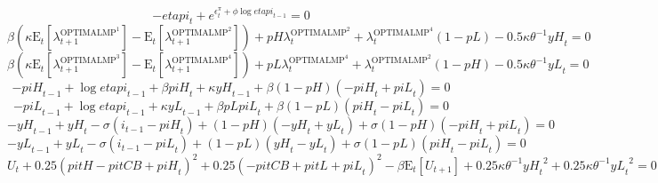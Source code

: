 \begin{equation}
-{e\!t\!a\!p\!i}_{t} + e^{\epsilon^{\pi}_{t} + {\phi} {\log{{e\!t\!a\!p\!i}_{t-1}}}} = 0
\end{equation}
\begin{equation}
{\beta} \left({\kappa} {\mathrm{E}_{t}\left[\lambda^{\mathrm{OPTIMALMP}^{\mathrm{1}}}_{t+1}\right]} - \mathrm{E}_{t}\left[\lambda^{\mathrm{OPTIMALMP}^{\mathrm{2}}}_{t+1}\right]\right) + {{p\!H}} {\lambda^{\mathrm{OPTIMALMP}^{\mathrm{2}}}_{t}} + {\lambda^{\mathrm{OPTIMALMP}^{\mathrm{4}}}_{t}} \left(1 - {p\!L}\right) - 0.5{\kappa} {\theta}^{-1} {{y\!H}_{t}} = 0
\end{equation}
\begin{equation}
{\beta} \left({\kappa} {\mathrm{E}_{t}\left[\lambda^{\mathrm{OPTIMALMP}^{\mathrm{3}}}_{t+1}\right]} - \mathrm{E}_{t}\left[\lambda^{\mathrm{OPTIMALMP}^{\mathrm{4}}}_{t+1}\right]\right) + {{p\!L}} {\lambda^{\mathrm{OPTIMALMP}^{\mathrm{4}}}_{t}} + {\lambda^{\mathrm{OPTIMALMP}^{\mathrm{2}}}_{t}} \left(1 - {p\!H}\right) - 0.5{\kappa} {\theta}^{-1} {{y\!L}_{t}} = 0
\end{equation}
\begin{equation}
-{p\!i\!H}_{t-1} + \log{{e\!t\!a\!p\!i}_{t-1}} + {\beta} {{p\!i\!H}_{t}} + {\kappa} {{y\!H}_{t-1}} + {\beta} \left(1 - {p\!H}\right) \left(-{p\!i\!H}_{t} + {p\!i\!L}_{t}\right) = 0
\end{equation}
\begin{equation}
-{p\!i\!L}_{t-1} + \log{{e\!t\!a\!p\!i}_{t-1}} + {\kappa} {{y\!L}_{t-1}} + {\beta} {{p\!L}} {{p\!i\!L}_{t}} + {\beta} \left(1 - {p\!L}\right) \left({p\!i\!H}_{t} - {p\!i\!L}_{t}\right) = 0
\end{equation}
\begin{equation}
-{y\!H}_{t-1} + {y\!H}_{t} - {\sigma} \left(i_{t-1} - {p\!i\!H}_{t}\right) + \left(1 - {p\!H}\right) \left(-{y\!H}_{t} + {y\!L}_{t}\right) + {\sigma} \left(1 - {p\!H}\right) \left(-{p\!i\!H}_{t} + {p\!i\!L}_{t}\right) = 0
\end{equation}
\begin{equation}
-{y\!L}_{t-1} + {y\!L}_{t} - {\sigma} \left(i_{t-1} - {p\!i\!L}_{t}\right) + \left(1 - {p\!L}\right) \left({y\!H}_{t} - {y\!L}_{t}\right) + {\sigma} \left(1 - {p\!L}\right) \left({p\!i\!H}_{t} - {p\!i\!L}_{t}\right) = 0
\end{equation}
\begin{equation}
U_{t} + 0.25\left({p\!i\!t\!H} - {p\!i\!t\!C\!B} + {p\!i\!H}_{t}\right)^{2} + 0.25\left(-{p\!i\!t\!C\!B} + {p\!i\!t\!L} + {p\!i\!L}_{t}\right)^{2} - {\beta} {\mathrm{E}_{t}\left[U_{t+1}\right]} + 0.25{\kappa} {\theta}^{-1} {{y\!H}_{t}}^{2} + 0.25{\kappa} {\theta}^{-1} {{y\!L}_{t}}^{2} = 0
\end{equation}
